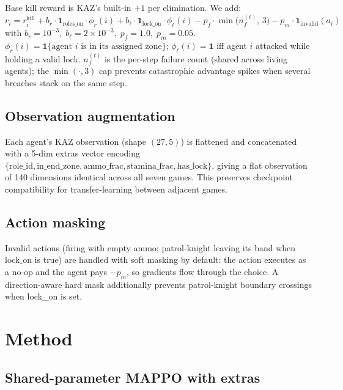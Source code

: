 \documentclass[11pt,a4paper]{article}
\begin{document}
Base kill reward is KAZ's built-in $+1$ per elimination. We add:
\begin{equation}
r_i = r^{\text{kill}}_i
    + b_r \cdot \mathbf{1}_{\text{roles\_on}} \cdot \phi_r(i)
    + b_\ell \cdot \mathbf{1}_{\text{lock\_on}} \cdot \phi_\ell(i)
    - p_f \cdot \min\bigl(n_f^{(t)},\, 3\bigr)
    - p_m \cdot \mathbf{1}_{\text{invalid}}(a_i)
\label{eq:reward}
\end{equation}
with $b_r = 10^{-3},\; b_\ell = 2 \times 10^{-3},\; p_f = 1.0,\; p_m = 0.05$.
$\phi_r(i) = \mathbf{1}\{\text{agent $i$ is in its assigned zone}\}$;
$\phi_\ell(i) = \mathbf{1}$ iff agent $i$ attacked while holding a valid
lock. $n_f^{(t)}$ is the per-step failure count (shared across living
agents); the $\min(\cdot, 3)$ cap prevents catastrophic advantage spikes
when several breaches stack on the same step.

\subsection{Observation augmentation}

Each agent's KAZ observation (shape $(27, 5)$) is flattened and
concatenated with a 5-dim extras vector encoding
$\{\text{role\_id}, \text{in\_end\_zone}, \text{ammo\_frac},
\text{stamina\_frac}, \text{has\_lock}\}$, giving a flat observation of
140 dimensions identical across all seven games. This preserves
checkpoint compatibility for transfer-learning between adjacent games.

\subsection{Action masking}

Invalid actions (firing with empty ammo; patrol-knight leaving its band
when $\text{lock\_on}$ is true) are handled with soft masking by default:
the action executes as a no-op and the agent pays $-p_m$, so gradients
flow through the choice. A direction-aware hard mask additionally
prevents patrol-knight boundary crossings when lock\_on is set.

\section{Method}
\label{sec:methods}

\subsection{Shared-parameter MAPPO with extras}
\end{document}
